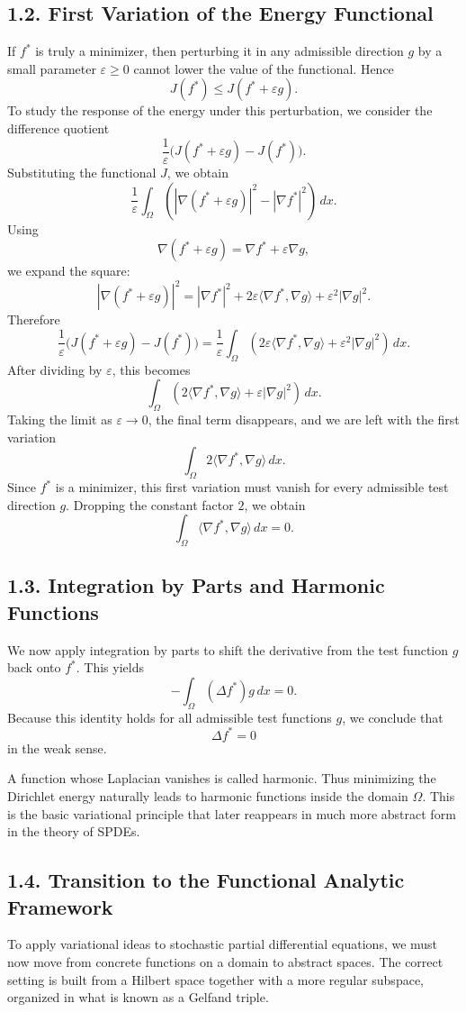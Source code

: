 \documentclass[11pt]{article}
\theoremstyle{definition}
\theoremstyle{remark}
\begin{document}
\subsection*{1.2. First Variation of the Energy Functional}
If \(f^*\) is truly a minimizer, then perturbing it in any admissible direction \(g\) by a small parameter \(\varepsilon\ge 0\) cannot lower the value of the functional. Hence
\[
J(f^*)\le J(f^*+\varepsilon g).
\]
To study the response of the energy under this perturbation, we consider the difference quotient
\[
\frac{1}{\varepsilon}\bigl(J(f^*+\varepsilon g)-J(f^*)\bigr).
\]
Substituting the functional \(J\), we obtain
\[
\frac{1}{\varepsilon}\int_\Omega \left(|\nabla(f^*+\varepsilon g)|^2-|\nabla f^*|^2\right)\,dx.
\]
Using
\[
\nabla(f^*+\varepsilon g)=\nabla f^*+\varepsilon \nabla g,
\]
we expand the square:
\[
|\nabla(f^*+\varepsilon g)|^2
=
|\nabla f^*|^2+2\varepsilon\langle \nabla f^*,\nabla g\rangle+\varepsilon^2|\nabla g|^2.
\]
Therefore
\[
\frac{1}{\varepsilon}\bigl(J(f^*+\varepsilon g)-J(f^*)\bigr)
=
\frac{1}{\varepsilon}\int_\Omega \left(2\varepsilon\langle \nabla f^*,\nabla g\rangle+\varepsilon^2|\nabla g|^2\right)\,dx.
\]
After dividing by \(\varepsilon\), this becomes
\[
\int_\Omega \left(2\langle \nabla f^*,\nabla g\rangle+\varepsilon |\nabla g|^2\right)\,dx.
\]
Taking the limit as \(\varepsilon\to 0\), the final term disappears, and we are left with the first variation
\[
\int_\Omega 2\langle \nabla f^*,\nabla g\rangle\,dx.
\]
Since \(f^*\) is a minimizer, this first variation must vanish for every admissible test direction \(g\). Dropping the constant factor \(2\), we obtain
\[
\int_\Omega \langle \nabla f^*,\nabla g\rangle\,dx=0.
\]

\subsection*{1.3. Integration by Parts and Harmonic Functions}
We now apply integration by parts to shift the derivative from the test function \(g\) back onto \(f^*\). This yields
\[
-\int_\Omega (\Delta f^*)g\,dx=0.
\]
Because this identity holds for all admissible test functions \(g\), we conclude that
\[
\Delta f^*=0
\]
in the weak sense.

A function whose Laplacian vanishes is called harmonic. Thus minimizing the Dirichlet energy naturally leads to harmonic functions inside the domain \(\Omega\). This is the basic variational principle that later reappears in much more abstract form in the theory of SPDEs.

\subsection*{1.4. Transition to the Functional Analytic Framework}
To apply variational ideas to stochastic partial differential equations, we must now move from concrete functions on a domain to abstract spaces. The correct setting is built from a Hilbert space together with a more regular subspace, organized in what is known as a Gelfand triple.
\end{document}
